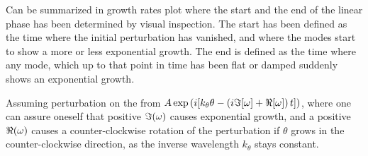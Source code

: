 %
Can be summarized in growth rates plot
where the start and the end of the linear phase has been determined by visual inspection.
The start has been defined as the time where the initial perturbation has vanished, and where the modes start to show a more or less exponential growth.
The end is defined as the time where any mode, which up to that point in time has been flat or damped suddenly shows an exponential growth.



Assuming perturbation on the from $A\exp\left(i[k_\theta \theta - \left(i\Im[\omega] + \Re[\omega]\right) t]\right)$, where one can assure oneself that positive $\Im(\omega)$ causes exponential growth, and a positive $\Re(\omega)$ causes a counter-clockwise rotation of the perturbation if $\theta$ grows in the counter-clockwise direction, as the inverse wavelength $k_\theta$ stays constant.
%
